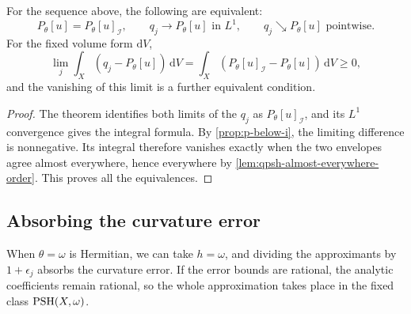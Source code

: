 \begin{corollary}\label{cor:dyadic-goodness-criterion}
For the sequence above, the following are equivalent:
\[
 P_\theta[u]=P_\theta[u]_{\mathcal I},\qquad
 q_j\longrightarrow P_\theta[u]\text{ in }L^1,
 \qquad q_j\searrow P_\theta[u]\text{ pointwise}.
\]
For the fixed volume form $\mathrm{d}V$,
\[
 \lim_j\int_X(q_j-P_\theta[u])\,\mathrm{d}V
   =\int_X(P_\theta[u]_{\mathcal I}-P_\theta[u])\,\mathrm{d}V\geq0,
\]
and the vanishing of this limit is a further equivalent condition.
\end{corollary}
\begin{proof}
The theorem identifies both limits of the $q_j$ as $P_\theta[u]_{\mathcal I}$, and its $L^1$ convergence gives the integral formula. By \cref{prop:p-below-i}, the limiting difference is nonnegative. Its integral therefore vanishes exactly when the two envelopes agree almost everywhere, hence everywhere by \cref{lem:qpsh-almost-everywhere-order}. This proves all the equivalences.
\end{proof}

\subsection{Absorbing the curvature error}

When $\theta=\omega$ is Hermitian, we can take $h=\omega$, and dividing the approximants by $1+\epsilon_j$ absorbs the curvature error. If the error bounds are rational, the analytic coefficients remain rational, so the whole approximation takes place in the fixed class $\mathrm{PSH}(X,\omega)$.

